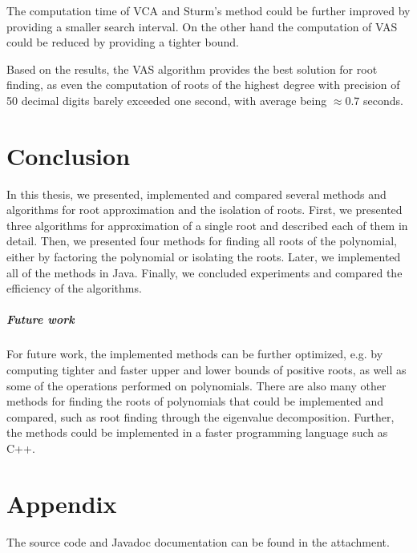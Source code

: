 \documentclass[
  digital, %
  notable,   %
  nolof,     %
  nolot,     %
	final, %
]{fithesis3}
\begin{document}
The computation time of VCA and Sturm's method could be further improved by providing a smaller search interval. On the other hand the computation of VAS could be reduced by providing a tighter bound.

Based on the results, the VAS algorithm provides the best solution for root finding, as even the computation of roots of the highest degree with precision of 50 decimal digits barely exceeded one second, with average being $\approx 0.7$ seconds.

\chapter{Conclusion}
In this thesis, we presented, implemented and compared several methods and algorithms for root approximation and the isolation of roots. First, we presented three algorithms for approximation of a single root and described each of them in detail. Then, we presented four methods for finding all roots of the polynomial, either by factoring the polynomial or isolating the roots. Later, we implemented all of the methods in Java. Finally, we concluded experiments and compared the efficiency of the algorithms.

\paragraph{Future work}
For future work, the implemented methods can be further optimized, e.g. by computing tighter and faster upper and lower bounds of positive roots, as well as some of the operations performed on polynomials. There are also many other methods for finding the roots of polynomials that could be implemented and compared, such as root finding through the eigenvalue decomposition. Further, the methods could be implemented in a faster programming language such as C++. 

\printbibliography[heading=bibintoc]


  \makeatletter\thesis@blocks@clear\makeatother
  \printindex

\chapter{Appendix}
The source code and Javadoc documentation can be found in the attachment.
\end{document}

